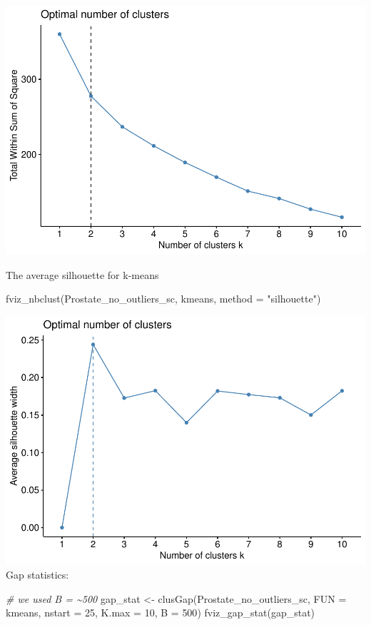 \documentclass[
]{article}
\newenvironment{Shaded}{\begin{snugshade}}{\end{snugshade}}
\newcommand{\AttributeTok}[1]{\textcolor[rgb]{0.77,0.63,0.00}{#1}}
\newcommand{\CommentTok}[1]{\textcolor[rgb]{0.56,0.35,0.01}{\textit{#1}}}
\newcommand{\DecValTok}[1]{\textcolor[rgb]{0.00,0.00,0.81}{#1}}
\newcommand{\FunctionTok}[1]{\textcolor[rgb]{0.00,0.00,0.00}{#1}}
\newcommand{\NormalTok}[1]{#1}
\newcommand{\OtherTok}[1]{\textcolor[rgb]{0.56,0.35,0.01}{#1}}
\newcommand{\StringTok}[1]{\textcolor[rgb]{0.31,0.60,0.02}{#1}}
\begin{document}
\includegraphics{clustering_files/figure-latex/unnamed-chunk-58-1.pdf}

The average silhouette for k-means

\begin{Shaded}
\begin{Highlighting}[]
\FunctionTok{fviz\_nbclust}\NormalTok{(Prostate\_no\_outliers\_sc, kmeans, }\AttributeTok{method =} \StringTok{"silhouette"}\NormalTok{)}
\end{Highlighting}
\end{Shaded}

\includegraphics{clustering_files/figure-latex/unnamed-chunk-59-1.pdf}
Gap statistics:

\begin{Shaded}
\begin{Highlighting}[]
\CommentTok{\# we used B = \textasciitilde{}500}
\NormalTok{gap\_stat }\OtherTok{\textless{}{-}} \FunctionTok{clusGap}\NormalTok{(Prostate\_no\_outliers\_sc, }\AttributeTok{FUN =}\NormalTok{ kmeans, }
                    \AttributeTok{nstart =} \DecValTok{25}\NormalTok{, }\AttributeTok{K.max =} \DecValTok{10}\NormalTok{, }\AttributeTok{B =} \DecValTok{500}\NormalTok{)}
\FunctionTok{fviz\_gap\_stat}\NormalTok{(gap\_stat)}
\end{Highlighting}
\end{Shaded}
\end{document}
